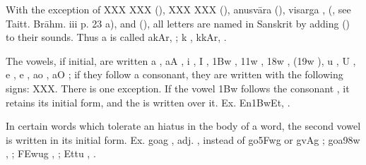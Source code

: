 \s With the exception of  XXX XXX (),  XXX XXX (), anusvāra
{\dn {\rs -\re}\2}  (), visarga {\dn ,}  (,
see Taitt. Brāhm. iii p. 23 a), and  (), all
letters are named in Sanskrit by adding  () to
their sounds. Thus {\dn a}  is called {\dn akAr,} ; {\dn k}
, {\dn kkAr,} .

\s The vowels, if initial, are written {\dn a} , {\dn aA} , {\dn i}
, {\dn I} , {\dn \31Bw} , {\dn \311w} , {\dn \318w} ,
({\dn \319w} ), {\dn u} , {\dn U} , {\dn e} , {\dn e\?}
, {\dn ao} , {\dn aO} ; if they follow a consonant, they are
written with the following signs: XXX. There is one exception. If the
vowel {\dn \31Bw}  follows the consonant {\dn {}} , it retains its
initial form, and the  is written over it. Ex. {\dn En\31Bw\0Et,}
.

In certain words which tolerate an hiatus in the body of a word, the
second vowel is written in its initial form. Ex. {\dn go{}ag\5} ,
adj. , instead of {\dn go\35Fwg\5}  or
{\dn gvAg\5} ; {\dn goa\398w\2} , ;
{\dn \3FEw{}ug} , ; {\dn Ett{}u} , .
